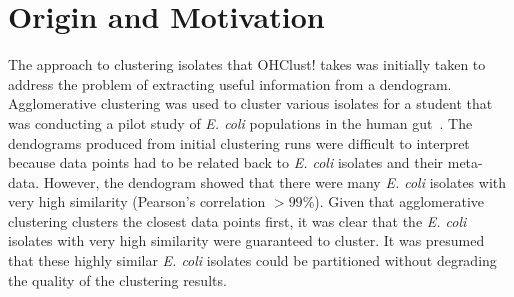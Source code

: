\documentclass[12pt]{ucthesis}
\begin{document}
   \section{Origin and Motivation}\label{sec:origin}
      The approach to clustering isolates that \textsf{OHClust!} takes was
      initially taken to address the problem of extracting useful information
      from a dendogram. \textsf{Agglomerative clustering} was used to cluster
      various isolates for a student that was conducting a pilot study of
      \textit{E. coli} populations in the human
      gut~\cite{Montana:ChronoCluster}. The dendograms produced from initial
      clustering runs were difficult to interpret because data points had to be
      related back to \textit{E. coli} isolates and their meta-data. However,
      the dendogram showed that there were many \textit{E. coli} isolates with
      very high similarity (Pearson's correlation $> 99\%$). Given that
      \textsf{agglomerative clustering} clusters the closest data points first,
      it was clear that the \textit{E. coli} isolates with very high similarity
      were guaranteed to cluster. It was presumed that these highly similar
      \textit{E. coli} isolates could be partitioned without degrading the
      quality of the clustering results.
      
\end{document}
